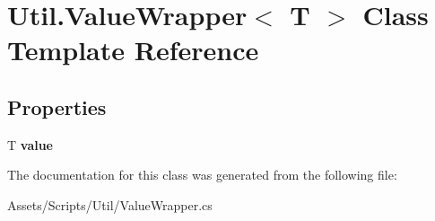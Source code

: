 \hypertarget{class_util_1_1_value_wrapper}{}\section{Util.\+Value\+Wrapper$<$ T $>$ Class Template Reference}
\label{class_util_1_1_value_wrapper}
\subsection*{Properties}
\begin{DoxyCompactItemize}
\item 
T {\bfseries value}\hypertarget{class_util_1_1_value_wrapper_a4ec0f68a75132a08d146b27003776d00}{}\label{class_util_1_1_value_wrapper_a4ec0f68a75132a08d146b27003776d00}

\end{DoxyCompactItemize}


The documentation for this class was generated from the following file\+:\begin{DoxyCompactItemize}
\item 
Assets/\+Scripts/\+Util/Value\+Wrapper.\+cs\end{DoxyCompactItemize}

